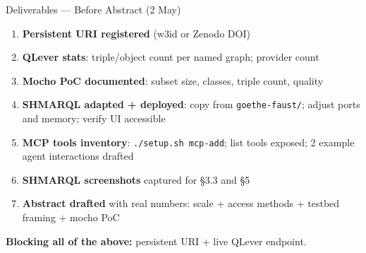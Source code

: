 \documentclass[xcolor,aspectratio=169,compress]{beamer}
\begin{document}
\begin{frame}{Deliverables --- Before Abstract (2 May)}
  \small
  \begin{enumerate}\setlength{\itemsep}{5pt}
    \item[$\square$] \textbf{Persistent URI registered} (w3id or Zenodo DOI)
    \item[$\square$] \textbf{QLever stats}: triple/object count per named graph; provider count
    \item[$\square$] \textbf{Mocho PoC documented}: subset size, classes, triple count, quality
    \item[$\square$] \textbf{SHMARQL adapted + deployed}: copy from \texttt{goethe-faust/};
          adjust ports and memory; verify UI accessible
    \item[$\square$] \textbf{MCP tools inventory}: \texttt{./setup.sh mcp-add};
          list tools exposed; 2 example agent interactions drafted
    \item[$\square$] \textbf{SHMARQL screenshots} captured for §3.3 and §5
    \item[$\square$] \textbf{Abstract drafted} with real numbers:
          scale + access methods + testbed framing + mocho PoC
  \end{enumerate}
  \begin{alertblock}{}
    \small \textbf{Blocking all of the above:} persistent URI + live QLever endpoint.
  \end{alertblock}
\end{frame}
\end{document}
